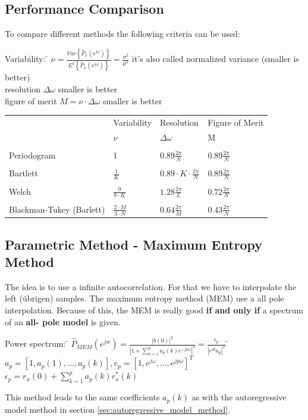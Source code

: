 \subsection{Performance Comparison }
To compare different methods the following criteria can be used:\\
\begin{tabbing}
Variability:   \hspace{1cm}  	\= 
  $\nu=\frac{Var\left\lbrace\hat{P}_{x}(e^{j\omega})\right\rbrace}{E^2\left\lbrace\hat{P}_{x}(e^{j\omega})\right\rbrace}=\frac{\sigma^2}{\mu^2}$ 
  \hspace{1cm} \= it's also called normalized variance (smaller is better)\\
  resolution \> $\Delta \omega$ \> smaller is better\\
  figure of merit					\> $M=\nu\cdot \Delta\omega$ \> smaller is better\\
\end{tabbing}
\begin{tabular}{p{3cm} | p{2cm} p{2.5cm} p{3cm}}
& Variability & Resolution & Figure of Merit\\
& $\nu$	&	$\Delta\omega$	& M \\
\hline\\
Periodogram & 1 & $0.89 \frac{2\pi}{N}$ & $0.89 \frac{2\pi}{N}$\\\\
Bartlett & $\frac{1}{K}$ & $0.89\cdot K \cdot  \frac{2\pi}{N}$ & $0.89 \frac{2\pi}{N}$\\\\
Welch & $\frac{9}{8\cdot K}$ & $1.28 \frac{2\pi}{L}$ & $0.72 \frac{2\pi}{N}$\\\\
Blackman-Tukey (Barlett)& $\frac{2\cdot M}{3\cdot N}$  & $0.64 \frac{2\pi}{M}$ & $0.43 \frac{2\pi}{N}$
\end{tabular}

\subsection{Parametric Method - Maximum Entropy Method }
The idea is to use a infinite autocorrelation. For that we have to interpolate the left (übrigen) samples. 
The maximum entropy method (MEM) use a all pole interpolation.
Because of this, the MEM is really good \textbf{if and only if} a spectrum of an \textbf{all- pole model} is given.

\begin{tabbing}
Power spectrum:  	\=  $\hat{P}_{MEM}(e^{jw}) =  \frac{|b(0)|^2}{\left| 1 + \sum\limits_{k=1}^{p} a_p(k)e^{-jk\omega}\right|^2} = \frac{\epsilon_p}{\left|e^H a_p\right|^2}$ \hspace{1cm} \= $a_p=[1,a_p(1),\ldots, a_p(k)],e_p=[1,e^{j\omega},\ldots, e^{jp\omega}]^T $ \\
\>						$\epsilon_p = r_x(0) + \sum\limits_{k=1}^p a_p(k) r_x^*(k)$ \\
\end{tabbing}
This method leads to the same coefficients $a_p(k)$ as with the autoregressive model method in section \ref{sec:autoregressive_model_method}.

